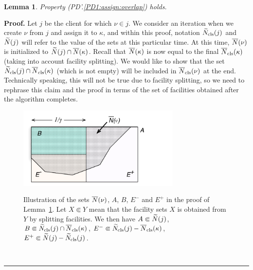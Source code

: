 \documentclass[oneside,final]{ucr}
\newtheorem{lemma}[theorem]{Lemma}
\newenvironment{proof}[1][Proof]{\textbf{#1.} }{\ \rule{0.5em}{0.5em}}
\def\dsp{\def\baselinestretch{2.0}\large\normalsize}
\def\ssp{\def\baselinestretch{1.0}\large\normalsize}
\begin{document}

\begin{lemma} \label{lem: PD1: primary overlap}
  Property (PD'.\ref{PD1:assign:overlap}) holds.
\end{lemma}
\begin{proof}
  Let $j$ be the client for which $\nu\in j$. We consider an iteration
  when we create $\nu$ from $j$ and assign it to $\kappa$, and
  within this proof, notation ${\widetilde N}_{{\mbox{\scriptsize\rm cls}}}(j)$ and ${\widetilde N}(j)$
  will refer to the value of the sets at this particular time.  
At this time, ${\overline{N}}(\nu)$ is initialized to ${\widetilde N}(j)\cap
  {\overline{N}}(\kappa)$.  Recall that ${\overline{N}}(\kappa)$ is now equal to the
  final ${\overline{N}}_{{\mbox{\scriptsize\rm cls}}}(\kappa)$ (taking into account facility splitting). We
  would like to show that the set ${\widetilde N}_{{\mbox{\scriptsize\rm cls}}}(j)\cap
  {\overline{N}}_{{\mbox{\scriptsize\rm cls}}}(\kappa)$ (which is not empty) will be included in
  ${\overline{N}}_{{\mbox{\scriptsize\rm cls}}}(\nu)$ at the end. Technically speaking, this will not be
  true due to facility splitting, so we need to rephrase this claim
  and the proof in terms of the set of facilities obtained after the
  algorithm completes.

\begin{figure}[ht]
\begin{center}
\includegraphics[width=3.2in]{proof_of_lemma_PD'3a.pdf}
\ssp
\caption[Illustration of the sets in the proof of
Lemma~\ref{lem: PD1: primary overlap}]{Illustration of the
  sets ${\overline{N}}(\nu)$, $A$, $B$, $E^-$ and $E^+$ in the proof
  of Lemma~\ref{lem: PD1: primary overlap}. Let $X \Subset
  Y$ mean that the facility sets $X$ is obtained from $Y$ by
  splitting facilities.  We then have $A \Subset
  {\widetilde N}(j)$, $B \Subset {\widetilde N}_{{\mbox{\scriptsize\rm cls}}}(j) \cap
  {\overline{N}}_{{\mbox{\scriptsize\rm cls}}}(\kappa)$, $E^- \Subset {\widetilde N}_{{\mbox{\scriptsize\rm cls}}}(j) -
  {\overline{N}}_{{\mbox{\scriptsize\rm cls}}}(\kappa)$, $E^+ \Subset {\widetilde N}(j) -
  {\widetilde N}_{{\mbox{\scriptsize\rm cls}}}(j)$.}
\dsp
\label{fig: sets lemma PD'3a}
\end{center}
\end{figure}


\end{proof}
\end{document}
